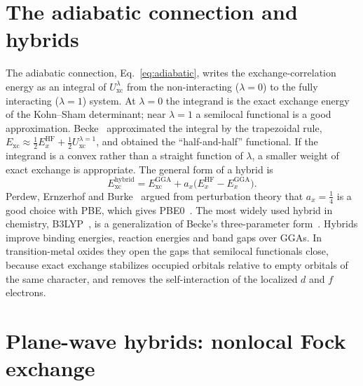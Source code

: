 \documentclass[11pt,a4paper,oneside]{book}
\begin{document}
\section{The adiabatic connection and hybrids}

The adiabatic connection, Eq.~\eqref{eq:adiabatic}, writes the
exchange-correlation energy as an integral of $U_{\mathrm{xc}}^\lambda$
from the non-interacting ($\lambda=0$) to the fully interacting
($\lambda=1$) system. At $\lambda=0$ the integrand is the exact exchange
energy of the Kohn--Sham determinant; near $\lambda=1$ a semilocal
functional is a good approximation. Becke~\cite{becke93_jcp98_1372}
approximated the integral by the trapezoidal rule,
$E_{\mathrm{xc}}\approx\frac12E_x^{\mathrm{HF}}+\frac12U_{\mathrm{xc}}^{\lambda=1}$,
and obtained the ``half-and-half'' functional. If the integrand is a
convex rather than a straight function of $\lambda$, a smaller weight of
exact exchange is appropriate. The general form of a hybrid is
\begin{equation}
  E_{\mathrm{xc}}^{\mathrm{hybrid}}=E_{\mathrm{xc}}^{\mathrm{GGA}}
  +a_x\bigl(E_x^{\mathrm{HF}}-E_x^{\mathrm{GGA}}\bigr).
  \label{eq:hybrid}
\end{equation}
Perdew, Ernzerhof and Burke~\cite{perdew96_jcp105_9982} argued from
perturbation theory that $a_x=\frac14$ is a good choice with PBE, which
gives PBE0~\cite{adamo99_jcp110_6158}. The most widely used hybrid in
chemistry, B3LYP~\cite{stephens94_jpc98_11623}, is a generalization of
Becke's three-parameter form~\cite{becke93_jcp98_5648}. Hybrids improve
binding energies, reaction energies and band gaps over GGAs. In
transition-metal oxides they open the gaps that semilocal functionals
close, because exact exchange stabilizes occupied orbitals relative to
empty orbitals of the same character, and removes the self-interaction
of the localized $d$ and $f$ electrons.

\section{Plane-wave hybrids: nonlocal Fock exchange}\label{sec:fock}
\end{document}
